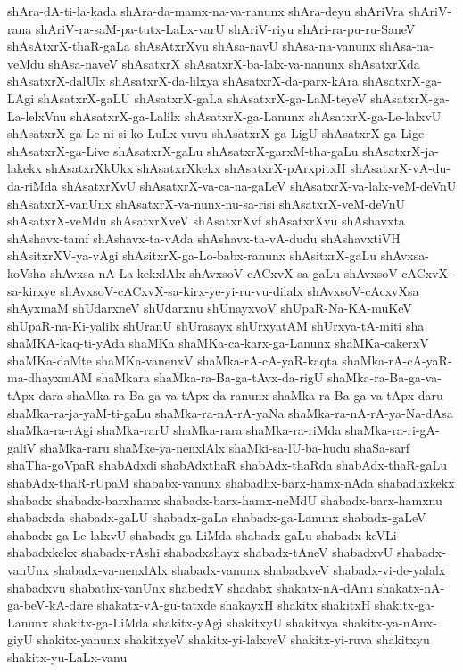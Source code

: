 {shAra-dA-ti-la-kada
shAra-da-mamx-na-va-ranunx
shAra-deyu
shAriVra
shAriV-rana
shAriV-ra-saM-pa-tutx-LaLx-varU
shAriV-riyu
shAri-ra-pu-ru-SaneV
shAsAtxrX-thaR-gaLa
shAsAtxrXvu
shAsa-navU
shAsa-na-vanunx
shAsa-na-veMdu
shAsa-naveV
shAsatxrX
shAsatxrX-ba-lalx-va-nanunx
shAsatxrXda
shAsatxrX-dalUlx
shAsatxrX-da-lilxya
shAsatxrX-da-parx-kAra
shAsatxrX-ga-LAgi
shAsatxrX-gaLU
shAsatxrX-gaLa
shAsatxrX-ga-LaM-teyeV
shAsatxrX-ga-La-lelxVnu
shAsatxrX-ga-Lalilx
shAsatxrX-ga-Lanunx
shAsatxrX-ga-Le-lalxvU
shAsatxrX-ga-Le-ni-si-ko-LuLx-vuvu
shAsatxrX-ga-LigU
shAsatxrX-ga-Lige
shAsatxrX-ga-Live
shAsatxrX-gaLu
shAsatxrX-garxM-tha-gaLu
shAsatxrX-ja-lakekx
shAsatxrXkUkx
shAsatxrXkekx
shAsatxrX-pArxpitxH
shAsatxrX-vA-du-da-riMda
shAsatxrXvU
shAsatxrX-va-ca-na-gaLeV
shAsatxrX-va-lalx-veM-deVnU
shAsatxrX-vanUnx
shAsatxrX-va-nunx-nu-sa-risi
shAsatxrX-veM-deVnU
shAsatxrX-veMdu
shAsatxrXveV
shAsatxrXvf
shAsatxrXvu
shAshavxta
shAshavx-tamf
shAshavx-ta-vAda
shAshavx-ta-vA-dudu
shAshavxtiVH
shAsitxrXV-ya-vAgi
shAsitxrX-ga-Lo-babx-ranunx
shAsitxrX-gaLu
shAvxsa-koVsha
shAvxsa-nA-La-kekxlAlx
shAvxsoV-cACxvX-sa-gaLu
shAvxsoV-cACxvX-sa-kirxye
shAvxsoV-cACxvX-sa-kirx-ye-yi-ru-vu-dilalx
shAvxsoV-cAcxvXsa
shAyxmaM
shUdarxneV
shUdarxnu
shUnayxvoV
shUpaR-Na-KA-muKeV
shUpaR-na-Ki-yalilx
shUranU
shUrasayx
shUrxyatAM
shUrxya-tA-miti
sha
shaMKA-kaq-ti-yAda
shaMKa
shaMKa-ca-karx-ga-Lanunx
shaMKa-cakerxV
shaMKa-daMte
shaMKa-vanenxV
shaMka-rA-cA-yaR-kaqta
shaMka-rA-cA-yaR-ma-dhayxmAM
shaMkara
shaMka-ra-Ba-ga-tAvx-da-rigU
shaMka-ra-Ba-ga-va-tApx-dara
shaMka-ra-Ba-ga-va-tApx-da-ranunx
shaMka-ra-Ba-ga-va-tApx-daru
shaMka-ra-ja-yaM-ti-gaLu
shaMka-ra-nA-rA-yaNa
shaMka-ra-nA-rA-ya-Na-dAsa
shaMka-ra-rAgi
shaMka-rarU
shaMka-rara
shaMka-ra-riMda
shaMka-ra-ri-gA-galiV
shaMka-raru
shaMke-ya-nenxlAlx
shaMki-sa-lU-ba-hudu
shaSa-sarf
shaTha-goVpaR
shabAdxdi
shabAdxthaR
shabAdx-thaRda
shabAdx-thaR-gaLu
shabAdx-thaR-rUpaM
shababx-vanunx
shabadhx-barx-hamx-nAda
shabadhxkekx
shabadx
shabadx-barxhamx
shabadx-barx-hamx-neMdU
shabadx-barx-hamxnu
shabadxda
shabadx-gaLU
shabadx-gaLa
shabadx-ga-Lanunx
shabadx-gaLeV
shabadx-ga-Le-lalxvU
shabadx-ga-LiMda
shabadx-gaLu
shabadx-keVLi
shabadxkekx
shabadx-rAshi
shabadxshayx
shabadx-tAneV
shabadxvU
shabadx-vanUnx
shabadx-va-nenxlAlx
shabadx-vanunx
shabadxveV
shabadx-vi-de-yalalx
shabadxvu
shabathx-vanUnx
shabedxV
shadabx
shakatx-nA-dAnu
shakatx-nA-ga-beV-kA-dare
shakatx-vA-gu-tatxde
shakayxH
shakitx
shakitxH
shakitx-ga-Lanunx
shakitx-ga-LiMda
shakitx-yAgi
shakitxyU
shakitxya
shakitx-ya-nAnx-giyU
shakitx-yanunx
shakitxyeV
shakitx-yi-lalxveV
shakitx-yi-ruva
shakitxyu
shakitx-yu-LaLx-vanu
}
